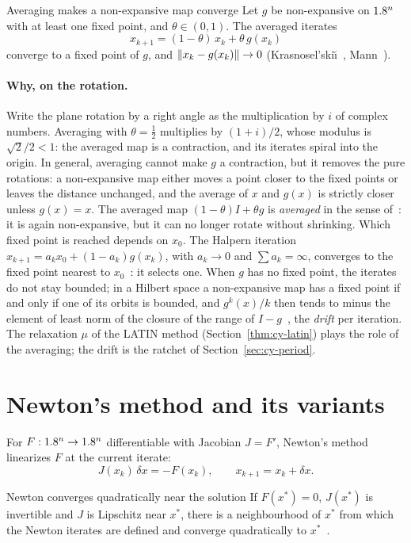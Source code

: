 \begin{gbox}{Averaging makes a non-expansive map converge}\label{thm:it-km}
Let $g$ be non-expansive on $1.8^n$ with at least one fixed point, and
$\theta\in(0,1)$. The averaged iterates
\begin{equation}\label{eq:it-km}
  x_{k+1}=(1-\theta)\,x_k+\theta\,g(x_k)
\end{equation}
converge to a fixed point of $g$, and $\lVert x_k-g(x_k)\rVert\to0$
(Krasnosel'ski\u{\i}~\cite{Krasnoselskii1955}, Mann~\cite{Mann1953}).
\end{gbox}
\paragraph{Why, on the rotation.} Write the plane rotation by a right angle as the multiplication by $i$ of
complex numbers. Averaging with $\theta=\tfrac12$ multiplies by $(1+i)/2$, whose
modulus is $\sqrt2/2<1$: the averaged map is a contraction, and its iterates
spiral into the origin. In general, averaging cannot make $g$ a contraction,
but it removes the pure rotations: a non-expansive map either moves a point
closer to the fixed points or leaves the distance unchanged, and the average
of $x$ and $g(x)$ is strictly closer unless $g(x)=x$.
The averaged map $(1-\theta)I+\theta g$ is \emph{averaged} in the sense
of~\cite[Ch.~4--5]{BauschkeCombettes2017b}: it is again non-expansive, but it
can no longer rotate without shrinking. Which fixed point is reached depends
on $x_0$. The Halpern iteration $x_{k+1}=a_kx_0+(1-a_k)g(x_k)$, with $a_k\to0$
and $\sum a_k=\infty$, converges to the fixed point nearest to
$x_0$~\cite{Halpern1967,BauschkeCombettes2017b}: it selects one. When $g$ has
no fixed point, the iterates do not stay bounded; in a Hilbert space a
non-expansive map has a fixed point if and only if one of its orbits is
bounded, and $g^k(x)/k$ then tends to minus the element of least norm of the
closure of the range of $I-g$~\cite{Pazy1971b}, the \emph{drift} per
iteration. The relaxation $\mu$ of the LATIN method
(Section~\ref{thm:cy-latin}) plays the role of the averaging; the drift is
the ratchet of Section~\ref{sec:cy-period}.

\section{Newton's method and its variants}\label{sec:it-newton}
%
For $F:1.8^n\to1.8^n$ differentiable with Jacobian $J=F'$, Newton's method
linearizes $F$ at the current iterate:
\begin{equation}\label{eq:it-newton}
  J(x_k)\,\delta x=-F(x_k),\qquad x_{k+1}=x_k+\delta x .
\end{equation}
\begin{gbox}{Newton converges quadratically near the solution}\label{thm:it-newton}
If $F(x^\ast)=0$, $J(x^\ast)$ is invertible and $J$ is Lipschitz near $x^\ast$,
there is a neighbourhood of $x^\ast$ from which the Newton iterates are defined
and converge quadratically to $x^\ast$~\cite[Ch.~5]{DennisSchnabel1983}.
\end{gbox}
